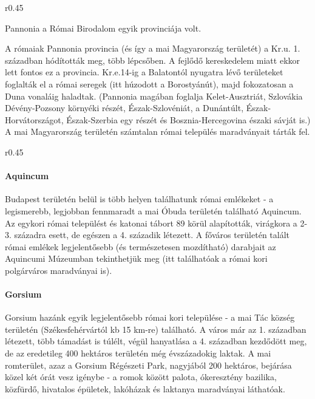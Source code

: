 \begin{wrapfigure}{r}{0.45\textwidth}
\end{wrapfigure}

Pannonia a Római Birodalom egyik provinciája volt. 

A rómaiak Pannonia provincia (és így a mai Magyarország területét) a Kr.u. 1. században hódították meg, több lépcsőben. A fejlődő kereskedelem miatt ekkor lett fontos ez a provincia. Kr.e.14-ig a Balatontól nyugatra lévő területeket foglalták el a római seregek (itt húzodott a Borostyánút), majd fokozatosan a Duna vonaláig haladtak. (Pannonia magában foglalja Kelet-Ausztriát, Szlovákia Dévény-Pozsony környéki részét, Észak-Szlovéniát, a Dunántúlt, Észak-Horvátországot, Észak-Szerbia egy részét és Bosznia-Hercegovina északi sávját is.) A mai Magyarország területén számtalan római település maradványait tárták fel.

\begin{wrapfigure}{r}{0.45\textwidth}
\end{wrapfigure}

\paragraph{Aquincum}
Budapest területén belül is több helyen találhatunk római emlékeket - a legismerebb, legjobban fennmaradt a mai Óbuda területén található Aquincum. Az egykori római települést és katonai tábort 89 körül alapították, virágkora a 2-3. századra esett, de egészen a 4. századik létezett. A főváros területén talált római emlékek legjelentősebb (és természetesen mozdítható) darabjait az Aquincumi Múzeumban tekinthetjük meg (itt találhatóak a római kori polgárváros maradványai is). 

\paragraph{Gorsium}
Gorsium hazánk egyik legjelentősebb római kori települése - a mai Tác község területén (Székesfehérvártól kb 15 km-re) található. A város már az 1. században létezett, több támadást is túlélt, végül hanyatlása a 4. században kezdődött meg, de az eredetileg 400 hektáros területén még évszázadokig laktak. A mai romterület, azaz a Gorsium Régészeti Park, nagyjából 200 hektáros, bejárása közel két órát vesz igénybe - a romok között palota, ókeresztény bazilika, közfürdő, hivatalos épületek, lakóházak és laktanya maradványai láthatóak. 

